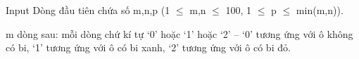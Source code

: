 Input
Dòng đầu tiên chứa số m,n,p (1 $\le$ m,n $\le$ 100, 1 $\le$ p $\le$ min(m,n)).  

   m dòng sau: mỗi dòng chứ kí tự ‘0’ hoặc ‘1’ hoặc ‘2’ – ‘0’ tương ứng với ô không có bi, ‘1’ tương ứng với ô có bi xanh, ‘2’ tương ứng với ô có bi đỏ.